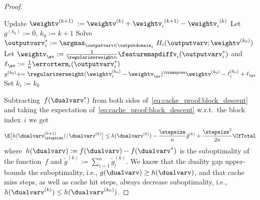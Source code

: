 \documentclass{article}
\begin{document}
\begin{proof}
\begin{algorithm}[t!]
\begin{algorithmic}[1]
        \STATE Update $\weightv^{(k+1)}\;:= \weightv^{(k)} + {\weightv_i}^{(k+1)} - {\weightv_i}^{(k)}$
        \STATE Let $g^{(k_0)} := 0$, $k_0 := k+1$
        \STATE Solve $\outputvarv_i^* := \displaystyle\argmax_{\outputvarv\in\outputdomain_i} \ H_i(\outputvarv;\weightv^{(k_0)})$ 
        \STATE Let $\weightv_{\sv} := \frac1{\regularizerweight n} \featuremapdiffv_i(\outputvarv_i^*)$ \;
        and \; $\ell_{\sv} := \frac1n \errorterm_i(\outputvarv_i^*)$
        \STATE $g^{(k_0)} +\!\!= \regularizerweight (\weightv_i^{(k_0)}-\weightv_{\sv})^\transpose \weightv^{(k_0)} - \ell_i^{(k_0)} + \ell_{\sv}$
        \STATE Set $k_i:=k_0$
        \ENDFOR
        \ENDIF
        \ENDFOR
    \end{algorithmic}
\end{algorithm}




Subtracting~$f(\dualvarv^*)$ from both sides of~\eqref{eq:cache_proof:block_descent} and taking the expectation of~\eqref{eq:cache_proof:block_descent} w.r.t.\ the block index~$i$ we get
\begin{equation}
\label{eq:cache_proof:block_descent_expected_h}
    \E\big[ h(\dualvarv^{(k+1)}_\stepsize)\,|\, \dualvarv^{(k)}\big] \leq h(\dualvarv^{(k)}) - \frac{\stepsize}{n} \tilde{g}^{(k)} + \frac{\stepsize^2}{2n}\CfTotal
\end{equation}
where~$h(\dualvarv):=f(\dualvarv)-f(\dualvarv^*)$ is the suboptimality of the function~$f$ and $\tilde{g}^{(k)} := \sum_{i=1}^n\tilde{g}_i^{(k)}$.
We know that the duality gap upper-bounds the suboptimality, i.e., $g(\dualvarv)\geq h(\dualvarv)$, and that cache miss steps, as well as cache hit steps, always decrease suboptimality, i.e., $h(\dualvarv^{(k)}) \leq h(\dualvarv^{(k_0)})$. 


\end{proof}
\end{document}
